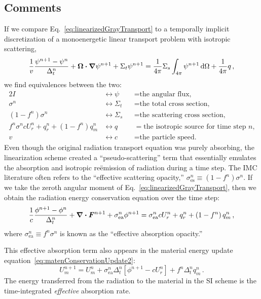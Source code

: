 \subsection{Comments}\label{bgSIComments}
If we compare Eq.~\eqref{eq:linearizedGrayTransport} to a temporally implicit
discretization of a monoenergetic linear transport problem with isotropic
scattering,
\begin{equation*}
  \frac{1}{v} \frac{\psi^{n+1} - \psi^n}{\Delta_t^n} 
  + \bm{\Omega} \bm{\cdot} \bm{\nabla} \psi^{n+1}
 + \Sigma_t \psi^{n+1}
 = \frac{1}{4\pi} \Sigma_s \int_{4\pi} \psi^{n+1}\mathop{}\!\mathrm{d} \Omega
  + \frac{1}{4\pi} q \,,
\end{equation*}
we find equivalences between the two:
\begin{alignat*}{2}
  I &\leftrightarrow \psi &&= \text{the angular flux,}
  \\
  \sigma^n &\leftrightarrow \Sigma_t &&= \text{the total cross section,}
  \\
  \left(1 - f^n\right) \sigma^n &\leftrightarrow \Sigma_s &&= \text{the scattering cross
  section,} 
  \\
  f^n \sigma^n c U_r^n + q_r^n + \left(1 - f^n\right) q_m^n &\leftrightarrow q &&= \text{the isotropic source for time
  step $n$,}
  \\
  v   &\leftrightarrow c &&= \text{the particle speed.}
\end{alignat*}
Even though the original radiation transport equation was purely
absorbing, the linearization scheme created a ``pseudo-scattering''
term that essentially emulates the absorption and isotropic re\"emission of
radiation during a time step. The IMC literature often refers to the
``effective scattering opacity,''
$\sigma_\text{es}^n \equiv \left(1 - f^n\right) \sigma^n$.
If we take the zeroth angular moment of
Eq.~\eqref{eq:linearizedGrayTransport}, then we obtain the radiation
energy conservation equation over the time step:
\begin{equation}\label{eq:semiImplicitZeroth}
  \frac{1}{c} \frac{\phi^{n+1} - \phi^n}{\Delta_t^n}
  + \bm{\nabla} \bm{\cdot} \bm{F}^{n+1} +\sigma_\text{ea}^n \phi^{n+1}
 =  \sigma_\text{ea}^n c U_r^n + q_r^n + \left(1 - f^n\right) q_m^n \,,
\end{equation}
where $\sigma_\text{ea}^n \equiv f^n\sigma^n$ is known as the
``effective absorption opacity.''

This effective absorption term also appears in the material energy update
equation~\eqref{eq:matenConservationUpdate2}:
\begin{equation*}
  U_m^{n+1} = U_m^n + \sigma_\text{ea}^n \Delta_t^n
  \left[ \phi^{n+1} - c U_r^n \right] + f^n \Delta_t^n q_m^n \,.
\end{equation*}
The energy transferred from the radiation to the material in the SI scheme is
the time-integrated \emph{effective} absorption rate.

